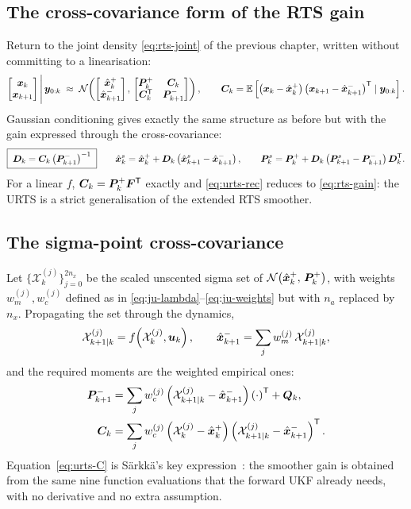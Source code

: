 \subsection{The cross-covariance form of the RTS gain}
Return to the joint density \eqref{eq:rts-joint} of the previous chapter, written without committing
to a linearisation:
\begin{equation}
\begin{bmatrix}\bm{x}_k\\ \bm{x}_{k+1}\end{bmatrix}\Bigg|\,\bm{y}_{0:k}
\;\approx\;
\mathcal{N}\!\left(\begin{bmatrix}\hat{\bm{x}}^{+}_k\\ \hat{\bm{x}}^{-}_{k+1}\end{bmatrix},\,\begin{bmatrix}\bm{P}^+_k & \bm{C}_k\\ \bm{C}_k^{\mathsf{T}} & \bm{P}^-_{k+1}\end{bmatrix}\right),
\qquad
\bm{C}_k=\mathbb{E}\left[\left(\bm{x}_k-\hat{\bm{x}}^{+}_k\right)\left(\bm{x}_{k+1}-\hat{\bm{x}}^{-}_{k+1}\right)^{\mathsf{T}}\mid\bm{y}_{0:k}\right] .
\label{eq:urts-joint}
\end{equation}
Gaussian conditioning gives exactly the same structure as before but with the gain expressed through
the cross-covariance:
\begin{equation}
\boxed{\;\bm{D}_k=\bm{C}_k\left(\bm{P}^-_{k+1}\right)^{-1}\;}
\qquad
\hat{\bm{x}}^s_k=\hat{\bm{x}}^{+}_k+\bm{D}_k\left(\hat{\bm{x}}^s_{k+1}-\hat{\bm{x}}^{-}_{k+1}\right),
\qquad
\bm{P}^s_k=\bm{P}^+_k+\bm{D}_k\left(\bm{P}^s_{k+1}-\bm{P}^-_{k+1}\right)\bm{D}_k^{\mathsf{T}} .
\label{eq:urts-rec}
\end{equation}
For a linear $f$, $\bm{C}_k=\bm{P}^+_k\bm{F}^{\mathsf{T}}$ exactly and \eqref{eq:urts-rec} reduces to
\eqref{eq:rts-gain}: the URTS is a strict generalisation of the extended RTS smoother.

\subsection{The sigma-point cross-covariance}
Let $\{\mathcal{X}^{(j)}_k\}_{j=0}^{2n_x}$ be the scaled unscented sigma set of
$\mathcal{N}\!\left(\hat{\bm{x}}^{+}_k,\,\bm{P}^+_k\right)$, with weights $w^{(j)}_m,w^{(j)}_c$ defined as in \eqref{eq:ju-lambda}--\eqref{eq:ju-weights}
but with $n_a$ replaced by $n_x$.  Propagating the set through the dynamics,
\begin{equation}
\mathcal{X}^{(j)}_{k+1|k}=f\!\left(\mathcal{X}^{(j)}_k,\bm{u}_k\right),
\qquad
\hat{\bm{x}}^{-}_{k+1}=\sum_{j} w^{(j)}_m\,\mathcal{X}^{(j)}_{k+1|k},
\label{eq:urts-prop}
\end{equation}
and the required moments are the weighted empirical ones:
\begin{align}
\bm{P}^-_{k+1}&=\sum_j w^{(j)}_c\left(\mathcal{X}^{(j)}_{k+1|k}-\hat{\bm{x}}^{-}_{k+1}\right)\left(\cdot\right)^{\mathsf{T}}+\bm{Q}_k,
\label{eq:urts-P}\\
\bm{C}_k&=\sum_j w^{(j)}_c\left(\mathcal{X}^{(j)}_k-\hat{\bm{x}}^{+}_k\right)\left(\mathcal{X}^{(j)}_{k+1|k}-\hat{\bm{x}}^{-}_{k+1}\right)^{\mathsf{T}} .
\label{eq:urts-C}
\end{align}
Equation~\eqref{eq:urts-C} is Särkkä's key expression~\cite[Eq.~(11)]{sarkka2008urts}: the smoother
gain is obtained from the same nine function evaluations that the forward UKF already needs, with no
derivative and no extra assumption.

